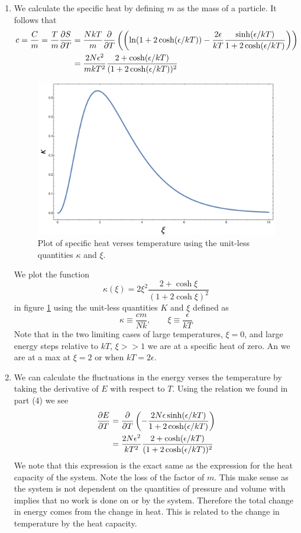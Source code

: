 \documentclass[11pt]{article}
\numberwithin{equation}{section}
\begin{document}
\begin{enumerate}[(1)]
\item We calculate the specific heat by defining $m$ as the mass of a particle. It follows 
that
\begin{align*}
c = \frac{C}{m} = \frac{T}{m}\frac{\partial{S}}{\partial{T}} &= \frac{NkT}{m}\frac{\partial{}}{\partial{T}}\left(\left(\ln(1+2\cosh(\epsilon/kT)) - \frac{2\epsilon}{kT}\frac{\sinh(\epsilon/kT)}{1+2\cosh(\epsilon/kT)}\right)\right)\\
&= \frac{2N\epsilon^2}{mkT^2}\frac{2+\cosh(\epsilon/kT)}{(1+2\cosh(\epsilon/kT))^2}
\end{align*}
\begin{figure}
\includegraphics[width=1.0\textwidth]{Plot.png}
\caption{Plot of specific heat verses temperature using the unit-less quantities $\kappa$ and $\xi$.}
\label{Plot}
\end{figure}
We plot the function 
$$\kappa(\xi) = 2\xi^2\frac{2+\cosh\xi}{(1+2\cosh\xi)^2}$$
in figure \ref{Plot} using the unit-less quantities $K$ and $\xi$ defined as
$$\kappa \equiv \frac{cm}{Nk},\qquad \xi \equiv \frac{\epsilon}{kT}$$
Note that in the two limiting cases of large temperatures, $\xi=0$, and large energy steps 
relative to $kT$, $\xi>>1$ we are at a specific heat of zero. An we are at a max at $\xi=2$ 
or when $kT=2\epsilon$.

\item We can calculate the fluctuations in the energy verses the temperature by taking the
derivative of $E$ with respect to $T$. Using the relation we found in part (4) we see
\begin{align*}
\frac{\partial{E}}{\partial{T}} &= \frac{\partial{}}{\partial{T}}\left(-\frac{2N\epsilon\sinh(\epsilon/kT)}{1+2\cosh(\epsilon/kT)}\right)\\
&= \frac{2N\epsilon^2}{kT^2}\frac{2+\cosh(\epsilon/kT)}{(1+2\cosh(\epsilon/kT))^2}
\end{align*}
We note that this expression is the exact same as the expression for the heat capacity of the
system. Note the loss of the factor of $m$. This make sense as the system is not dependent on
the quantities of pressure and volume with implies that no work is done on or by the system.
Therefore the total change in energy comes from the change in heat. This is related to the
change in temperature by the heat capacity.
\end{enumerate}
\end{document}
